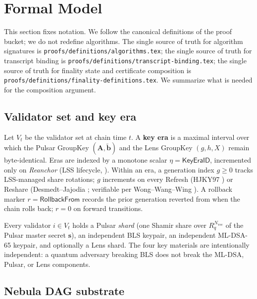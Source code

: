 \section{Formal Model}
\label{sec:formal-model}

This section fixes notation. We follow the canonical definitions of the proof bucket; we do not redefine algorithms. The single source of truth for algorithm signatures is \texttt{proofs/definitions/algorithms.tex}; the single source of truth for transcript binding is \texttt{proofs/definitions/transcript-binding.tex}; the single source of truth for finality state and certificate composition is \texttt{proofs/definitions/finality-definitions.tex}. We summarize what is needed for the composition argument.

\subsection{Validator set and key era}

Let $V_t$ be the validator set at chain time $t$. A \textbf{key era} is a maximal interval over which the Pulsar GroupKey $(\mathbf{A}, \tilde{\mathbf{b}})$ and the Lens GroupKey $(g, h, X)$ remain byte-identical. Eras are indexed by a monotone scalar $\eta = \mathsf{KeyEraID}$, incremented only on \emph{Reanchor} (LSS lifecycle, \cite{luxlssmpc,lp077}). Within an era, a generation index $g \geq 0$ tracks LSS-managed share rotations; $g$ increments on every Refresh (HJKY97 \cite{hjky97}) or Reshare (Desmedt--Jajodia \cite{desmedtjajodia97}; verifiable per Wong--Wang--Wing \cite{wongwangwing02}). A rollback marker $r = \mathsf{RollbackFrom}$ records the prior generation reverted from when the chain rolls back; $r=0$ on forward transitions.

Every validator $i \in V_t$ holds a Pulsar \emph{shard} (one Shamir share over $R_q^{N_{\textrm{vec}}}$ of the Pulsar master secret $\mathbf{s}$), an independent BLS keypair, an independent ML-DSA-65 keypair, and optionally a Lens shard. The four key materials are intentionally independent: a quantum adversary breaking BLS does not break the ML-DSA, Pulsar, or Lens components.

\subsection{Nebula DAG substrate}


